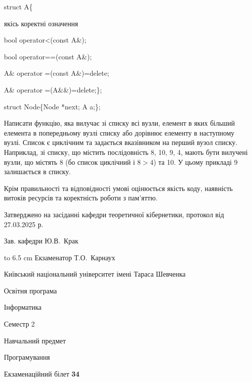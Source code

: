 \documentclass[12pt, ukrainian]{article}
\begin{document}
{struct A\{

\quad  якісь коректні означення 

\quad  bool operator<(const A\&); 

\quad  bool operator==(const A\&); 

\quad A\& operator =(const A\&)=delete; 

\quad  A\& operator =(A\&\&)=delete;\};

struct Node\{Node *next; A a;\};

 Написати функцію, яка вилучає зі списку всі вузли, елемент в яких більший елемента в попередньому вузлі списку або дорівнює елементу в наступному вузлі. Список є циклічним та задається вказівником на перший вузол списку. Наприклад, зі списку, що містить послідовність 8, 10, 9, 4, мають бути вилучені вузли, що містять 8 (бо список циклічний і $8>4$) та 10. У цьому прикладі 9 залишається в списку.

Крім правильності та відповідності умові оцінюється якість коду, наявність витоків ресурсів та коректність роботи з пам'яттю. 

}
{\smallskip\smallskip \begin {scriptsize} Затверджено на засіданні кафедри теоретичної кібернетики, протокол   від   27.03.2025 р.\par\smallskip\smallskip\smallskip\smallskip
{\parbox {6.5 cm} {Зав. кафедри \dotfill Ю.В.~Крак}}\hspace {0.7cm} {\hbox to 6.5 cm { Екзаменатор \dotfill Т.О.~Карнаух}} \end{scriptsize}}
\newpage
{{\begin {scriptsize}\par
{ \center  Київський національний університет імені Тараса Шевченка \par}
{\parbox {5 cm}{Освітня програма \hfill}{\parbox {7 cm}{Інформатика\hfill}}\parbox {6 cm}{\hfill Семестр 2}}\par
{\parbox {5 cm} {Навчальний предмет \hfill}\parbox {7 cm}{Програмування \hfill}\parbox {6cm}{\hfill}\par}\vspace{-15pt} \end{scriptsize}}{\center Екзаменаційний білет \No \textbf { 34 }\par}}
\end{document}
